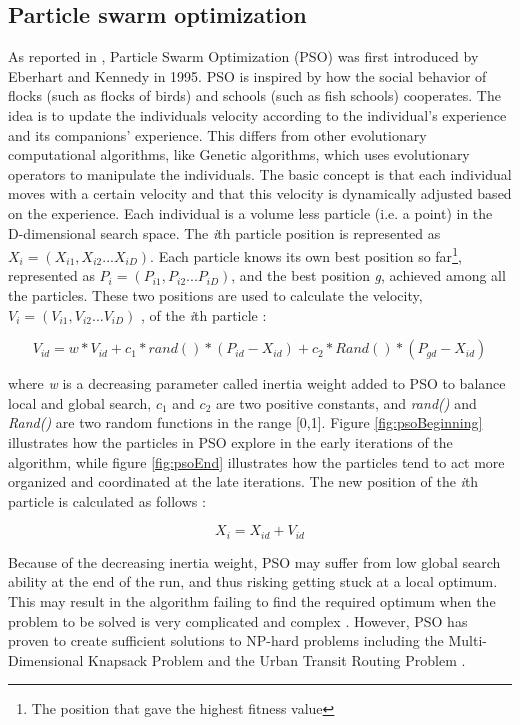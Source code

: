 \subsection{Particle swarm optimization}
\label{subsec:pso}
As reported in \citet{shi99}, Particle Swarm Optimization (PSO) was first introduced by Eberhart and Kennedy in 1995. PSO is inspired by how the social behavior of flocks (such as flocks of birds) and schools (such as fish schools) cooperates. The idea is to update the individuals velocity according to the individual's experience and its companions' experience. This differs from other evolutionary computational algorithms, like Genetic algorithms, which uses evolutionary operators to manipulate the individuals. The basic concept is that each individual moves with a certain velocity and that this velocity is dynamically adjusted based on the experience. Each individual is a volume less particle (i.e. a point) in the D-dimensional search space. The \textit{i}th particle position is represented as $X_i = (X_{i1},X_{i2}...X_{iD})$. Each particle knows its own best position so far\footnote{The position that gave the highest fitness value}, represented as $P_i = (P_{i1},P_{i2}...P_{iD})$, and the best position \textit{g}, achieved among all the particles. These two positions are used to calculate the velocity, $V_i = (V_{i1},V_{i2}...V_{iD})$ ,  of the \textit{i}th particle \citep{shi99}: 

$$V_{id} = w * V_{id} + c_1 * rand() * (P_{id}-X_{id}) + c_2 * Rand() * (P_{gd}-X_{id})$$

where \textit{w} is a decreasing parameter called inertia weight added to PSO to balance local and global search, $c_1$ and $c_2$ are two positive constants, and \textit{rand()} and \textit{Rand()} are two random functions in the range [0,1]. Figure \ref{fig:psoBeginning} illustrates how the particles in PSO explore in the early iterations of the algorithm, while figure \ref{fig:psoEnd} illustrates how the particles tend to act more organized and coordinated at the late iterations. The new position of the \textit{i}th particle is calculated as follows \citep{shi99}:

$$X_i = X_{id} + V_{id}$$

Because of the decreasing inertia weight, PSO may suffer from low global search ability at the end of the run, and thus risking getting stuck at a local optimum. This may result in the algorithm failing to find the required optimum when the problem to be solved is very complicated and complex \citep{shi99}. However, PSO has proven to create sufficient solutions to NP-hard problems including the Multi-Dimensional Knapsack Problem \citep{wan09} and the Urban Transit Routing Problem \citep{kechagiopoulos14}. 

